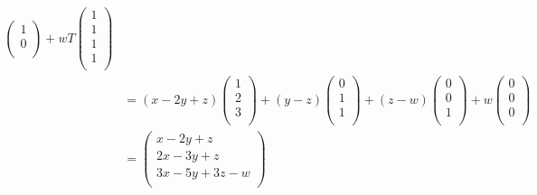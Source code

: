 \documentclass{eh-homework}
\begin{document}
\begin{question}{3}
\begin{align*}
\begin{pmatrix}
                1 \\
                0 \\
            \end{pmatrix}
            +wT\begin{pmatrix}
                1 \\
                1 \\
                1 \\
                1 \\
           \end{pmatrix} \\
           &=
           (x - 2y + z)
           \begin{pmatrix}
             1 \\
             2 \\
             3 \\
           \end{pmatrix}
           +(y-z)
           \begin{pmatrix}
             0 \\
             1 \\
             1 \\
           \end{pmatrix}
           +(z-w)
           \begin{pmatrix}
             0 \\
             0 \\
             1 \\
           \end{pmatrix}
           +w
           \begin{pmatrix}
             0 \\
             0 \\
             0 \\
           \end{pmatrix} \\
           &=\begin{pmatrix}
             x - 2y + z \\
             2x -3y + z \\
             3x - 5y + 3z - w \\
           \end{pmatrix}
        \end{align*}
    \end{question}
\end{document}
